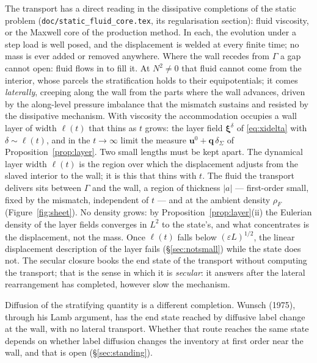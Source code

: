 \documentclass[11pt]{article}
\theoremstyle{definition}
\theoremstyle{remark}
\newcommand{\bu}{\mathbf{u}}
\newcommand{\bq}{\mathbf{q}}
\newcommand{\bxi}{\boldsymbol{\xi}}
\newcommand{\code}[1]{\texttt{#1}}
\begin{document}
The transport has a direct reading in the dissipative completions of
the static problem (\code{doc/static\_fluid\_core.tex}, its
regularisation section): fluid viscosity, or the Maxwell core of the
production method. In each, the evolution under a step load is well
posed, and the displacement is welded at every finite time; no mass is
ever added or removed anywhere. Where the wall recedes from $\Gamma$ a
gap cannot open: fluid flows in to fill it. At $N^2 \ne 0$ that fluid
cannot come from the interior, whose parcels the stratification holds
to their equipotentials; it comes \emph{laterally}, creeping along the
wall from the parts where the wall advances, driven by the along-level
pressure imbalance that the mismatch sustains and resisted by the
dissipative mechanism. With viscosity the accommodation occupies a wall
layer of width $\ell(t)$ that thins as $t$ grows: the layer field
$\bxi^\delta$ of \eqref{eq:xidelta} with $\delta \sim \ell(t)$, and in
the $t \to \infty$ limit the measure $\bu^0 + \bq\,\delta_\Sigma$ of
Proposition~\ref{prop:layer}. Two small lengths must be kept apart.
The dynamical layer width $\ell(t)$ is the region over which the
displacement adjusts from the slaved interior to the wall; it is this
that thins with $t$. The fluid the transport delivers sits between
$\Gamma$ and the wall, a region of thickness $|a|$ --- first-order small,
fixed by the mismatch, independent of $t$ --- and at the ambient density
$\rho_F$ (Figure~\ref{fig:sheet}). No density grows: by
Proposition~\ref{prop:layer}(ii) the Eulerian density of the layer
fields converges in $L^2$ to the state's, and what concentrates is the
displacement, not the mass. Once $\ell(t)$ falls below $(\varepsilon
L)^{1/2}$, the linear displacement description of the layer fails
(\S\ref{sec:notsmall}) while the state does not. The secular closure
books the end state of the transport without computing the transport;
that is the sense in which it is \emph{secular}: it answers after the
lateral rearrangement has completed, however slow the mechanism.

Diffusion of the stratifying quantity is a different completion. Wunsch
(1975), through his Lamb argument, has the end state reached by
diffusive label change at the wall, with no lateral transport. Whether
that route reaches the same state depends on whether label diffusion
changes the inventory at first order near the wall, and that is open
(\S\ref{sec:standing}).
\end{document}
